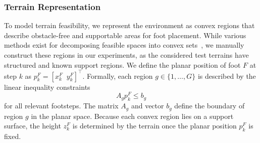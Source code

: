 \documentclass[letterpaper, 10 pt, journal, twoside]{IEEEtran}
\begin{document}
\subsubsection{Terrain Representation}
To model terrain feasibility, we represent the environment as convex regions that describe obstacle-free and supportable areas for foot placement.
While various methods exist for decomposing feasible spaces into convex sets~\cite{Deits2015Computing, werner2024faster}, we manually construct these regions in our experiments, as the considered test terrains have structured and known support regions.
We define the planar position of foot $F$ at step $k$ as $p_k^F = [x_k^F\;\; y_k^F]^\top$.
Formally, each region $g \in \{1,\dots,G\}$ is described by the linear inequality constraints
\begin{equation}
    A_g p_k^F \le b_g
    \label{eq:terrain_region}
\end{equation}
for all relevant footsteps.
The matrix $A_g$ and vector $b_g$ define the boundary of region $g$ in the planar space.
Because each convex region lies on a support surface, the height $z_k^F$ is determined by the terrain once the planar position $p_k^F$ is fixed.
\end{document}
